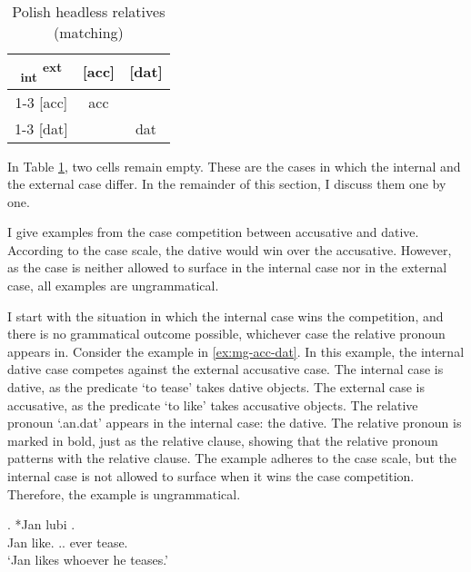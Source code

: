 \begin{table}[ht]
 \center
 \caption{Polish headless relatives (matching)}
 \begin{tabular}{c|c|c}
   \toprule
   \textsubscript{\ac{int}} \textsuperscript{\ac{ext}}
          & [\ac{acc}]
          & [\ac{dat}]
          \\ \cmidrule{1-3}
      [\ac{acc}]
          & \cellcolor{LG}\ac{acc}
          &
          \\ \cmidrule{1-3}
      [\ac{dat}]
          &
          & \cellcolor{DG}\ac{dat}
          \\
    \bottomrule
 \end{tabular}
   \label{tbl:summary-polish-matching}
\end{table}

In Table \ref{tbl:summary-polish-matching}, two cells remain empty. These are the cases in which the internal and the external case differ. In the remainder of this section, I discuss them one by one.

I give examples from the case competition between accusative and dative. According to the case scale, the dative would win over the accusative. However, as the case is neither allowed to surface in the internal case nor in the external case, all examples are ungrammatical.

I start with the situation in which the internal case wins the competition, and there is no grammatical outcome possible, whichever case the relative pronoun appears in.
Consider the example in \ref{ex:mg-acc-dat}. In this example, the internal dative case competes against the external accusative case.
The internal case is dative, as the predicate  `to tease' takes dative objects.
The external case is accusative, as the predicate  `to like' takes accusative objects.
The relative pronoun  `.\ac{an}.\ac{dat}' appears in the internal case: the dative. The relative pronoun is marked in bold, just as the relative clause, showing that the relative pronoun patterns with the relative clause.
The example adheres to the case scale, but the internal case is not allowed to surface when it wins the case competition. Therefore, the example is ungrammatical.

\exg. *Jan lubi   .\\
Jan like.\scsub{[acc]} .. ever tease.\scsub{[dat]}\\
`Jan likes whoever he teases.' \label{ex:polish-acc-dat}

